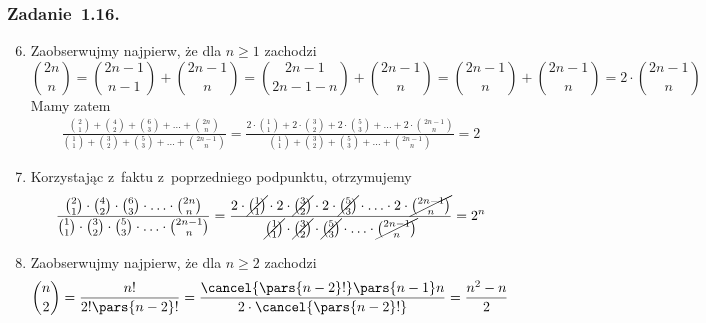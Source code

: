 \subsubsection*{Zadanie~1.16.}
\begin{enumerate}[label={\alph**)}]
    \setcounter{enumi}{5}
    \item
        Zaobserwujmy najpierw, że dla \(n \geq 1\) zachodzi
        \begin{equation*}
            \binom{2n}{n}
                = \binom{2n - 1}{n - 1} + \binom{2n - 1}{n}
                = \binom{2n - 1}{2n - 1 - n} + \binom{2n - 1}{n}
                = \binom{2n - 1}{n} + \binom{2n - 1}{n}
                = 2 \cdot \binom{2n - 1}{n}
        \end{equation*}
        Mamy zatem
        \begin{equation*}
            \begin{split}
                \frac{\binom{2}{1} + \binom{4}{2} + \binom{6}{3} + \ldots + \binom{2n}{n}}{\binom{1}{1} + \binom{3}{2} + \binom{5}{3} + \ldots + \binom{2n - 1}{n}}
                    = \frac{2 \cdot \binom{1}{1} + 2 \cdot \binom{3}{2} + 2 \cdot \binom{5}{3} + \ldots + 2 \cdot \binom{2n - 1}{n}}{\binom{1}{1} + \binom{3}{2} + \binom{5}{3} + \ldots + \binom{2n - 1}{n}}
                    = 2
            \end{split}
        \end{equation*}
    \item
        Korzystając z~faktu z~poprzedniego podpunktu, otrzymujemy
        \begin{equation*}
            \frac{\binom{2}{1} \cdot \binom{4}{2} \cdot \binom{6}{3} \cdot \ldots \cdot \binom{2n}{n}}{\binom{1}{1} \cdot \binom{3}{2} \cdot \binom{5}{3} \cdot \ldots \cdot \binom{2n - 1}{n}}
                = \frac{2 \cdot \cancel{\binom{1}{1}} \cdot 2 \cdot \cancel{\binom{3}{2}} \cdot 2 \cdot \cancel{\binom{5}{3}} \cdot \ldots \cdot 2 \cdot \cancel{\binom{2n - 1}{n}}}{\cancel{\binom{1}{1}} \cdot \cancel{\binom{3}{2}} \cdot \cancel{\binom{5}{3}} \cdot \ldots \cdot \cancel{\binom{2n - 1}{n}}}
                = 2^n
        \end{equation*}
    \item
        Zaobserwujmy najpierw, że dla \(n \geq 2\) zachodzi
        \begin{equation*}
            \binom{n}{2}
                = \frac{n!}{2!\pars{n - 2}!}
                = \frac{\cancel{\pars{n - 2}!}\pars{n - 1}n}{2 \cdot \cancel{\pars{n - 2}!}}
                = \frac{n^2 - n}{2}
        \end{equation*}

\end{enumerate}

